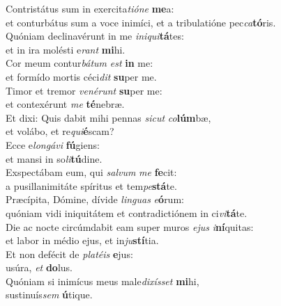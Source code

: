 \evenverse Contristátus sum in exercita\textit{ti}\textit{ó}\textit{ne} \textbf{me}a:~\*\\
\evenverse et conturbátus sum a voce inimíci, et a tribulatióne pec\textit{ca}\textbf{tó}ris.\\
\oddverse Quóniam declinavérunt in me \textit{i}\textit{ni}\textit{qui}\textbf{tá}tes:~\*\\
\oddverse et in ira molésti e\textit{rant} \textbf{mi}hi.\\
\evenverse Cor meum contur\textit{bá}\textit{tum} \textit{est} \textbf{in} me:~\*\\
\evenverse et formído mortis céci\textit{dit} \textbf{su}per me.\\
\oddverse Timor et tremor \textit{ve}\textit{né}\textit{runt} \textbf{su}per me:~\*\\
\oddverse et contexérunt \textit{me} \textbf{té}nebræ.\\
\evenverse Et dixi: Quis dabit mihi pennas \textit{si}\textit{cut} \textit{co}\textbf{lúm}bæ,~\*\\
\evenverse et volábo, et re\textit{qui}\textbf{é}scam?\\
\oddverse Ecce e\textit{lon}\textit{gá}\textit{vi} \textbf{fú}giens:~\*\\
\oddverse et mansi in so\textit{li}\textbf{tú}dine.\\
\evenverse Exspectábam eum, qui \textit{sal}\textit{vum} \textit{me} \textbf{fe}cit:~\*\\
\evenverse a pusillanimitáte spíritus et tem\textit{pe}\textbf{stá}te.\\
\oddverse Præcípita, Dómine, dívide \textit{lin}\textit{guas} \textit{e}\textbf{ó}rum:~\*\\
\oddverse quóniam vidi iniquitátem et contradictiónem in ci\textit{vi}\textbf{tá}te.\\
\evenverse Die ac nocte circúmdabit eam super muros \textit{e}\textit{jus} \textit{i}\textbf{ní}quitas:~\*\\
\evenverse et labor in médio ejus, et in\textit{ju}\textbf{stí}tia.\\
\oddverse Et non defécit de \textit{pla}\textit{té}\textit{is} \textbf{e}jus:~\*\\
\oddverse usúra, \textit{et} \textbf{do}lus.\\
\evenverse Quóniam si inimícus meus male\textit{di}\textit{xís}\textit{set} \textbf{mi}hi,~\*\\
\evenverse sustinuís\textit{sem} \textbf{ú}tique.\\
